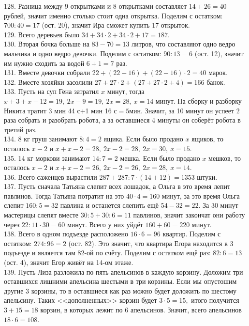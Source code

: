 \documentclass[12pt]{article}
\begin{document}
128. Разница между 9 открытками и 8 открытками составляет $14+26=40$ рублей, значит именно столько стоит одна открытка. Поделим с остатком: $700:40=17$ (ост. 20), значит Ира сможет купить 17 открыток.\\
129. Всего деревьев было $34+34\cdot2+34\cdot2+17=187.$\\
130. Вторая бочка больше на $83-70=13$ литров, что составляют одно ведро мальчика и одно ведро девочки. Поделим с остатком: $90:13=6$ (ост. 12), значит им нужно сходить за водой $6+1=7$ раз.\\
131. Вместе девочки собрали $22+(22-16)+(22-16)\cdot2=40$ марок.\\
132. Вместе хозяйки засолили $27+27\cdot2+(27+27\cdot2+4)=166$ банок.\\
133. Пусть на суп Гена затратил $x$ минут, тогда $x+3+x-12=19,\ 2x-9=19,\ 2x=28,\ x=14$ минут. На сборку и разборку Никита тратит 3 мин 44 с$+$1 мин 16 с$=5$мин. Значит, за 10 минут он успеет 2 раза собрать и разобрать робота, а за оставшиеся 4 минуты он соберёт робота в третий раз.\\
134. 8 кг груш занимают $8:4=2$ ящика. Если было продано $x$ ящиков, то осталось $x-2$ и $x+x-2=28,\ 2x-2=28,\ 2x=30,\ x=15.$\\
135. 14 кг моркови занимают $14:7=2$ мешка. Если было продано $x$ мешков, то осталось $x-2$ и $x+x-2=26,\ 2x-2=26,\ 2x=28,\ x=14.$\\
136. Всего саженцев вырастили $287+287:7\cdot(14+12)=1353$ штуки.\\
137. Пусть сначала Татьяна слепит всех лошадок, а Ольга в это время лепит павлинов. Тогда Татьяна потратит на это $40\cdot4=160$ минут, за это время Ольга слепит $160:5=32$ павлина и останется слепить ещё $54-32=22.$ За 30 минут мастерицы слепят вместе $30:5+30:6=11$ павлинов, значит закончат они работу через $22:11\cdot30=60$ минут. Всего у них уйдёт $160+60=220$ минут.\\
138. Всего в одном подъезде расположено $16\cdot6=96$ квартир. Поделим с остатком: $274:96=2$ (ост. 82). Это значит, что квартира Егора находится в 3 подъезде и является там 82-ой по счёту. Поделим с остатком ещё раз: $82:6=13$ (ост. 4), значит Егор живёт на 14-ом этаже.\\
139.  Пусть Лиза разложила по пять апельсинов в каждую корзину. Доложим три оставшихся лишними апельсина шестыми в три корзины. Если мы опустошим другие 3 корзины, то в оставшиеся как раз можно будет доложить по шестому апельсину. Таких <<дополненных>> корзин будет $3\cdot5=15,$ итого получится $3+15=18$ корзин, в которых лежит по 6 апельсинов. Значит, всего апельсинов $18\cdot6=108.$\\
\end{document}

